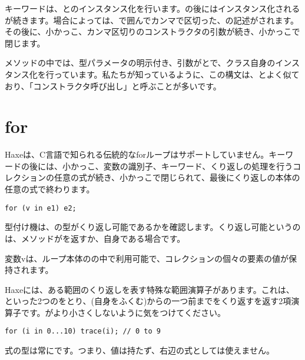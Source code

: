 キーワードは、とのインスタンス化を行います。の後にはインスタンス化されるが続きます。場合によっては、\expr{<>}で囲んでカンマ\expr{,}で区切った、の記述がされます。その後に、小かっこ\expr{(}、カンマ\expr{,}区切りのコンストラクタの引数が続き、小かっこ\expr{)}で閉じます。


メソッドの中では、型パラメータの明示付き、引数がとで、クラス自身のインスタンス化を行っています。私たちが知っているように、この構文は、とよく似ており、「コンストラクタ呼び出し」と呼ぶことが多いです。

\section{for}
\label{expression-for}

Haxeは、C言語で知られる伝統的なforループはサポートしていません。キーワードの後には、小かっこ\expr{(}、変数の識別子、キーワード、くり返しの処理を行うコレクションの任意の式が続き、小かっこ\expr{)}で閉じられて、最後にくり返しの本体の任意の式で終わります。

\begin{lstlisting}
for (v in e1) e2;
\end{lstlisting}

型付け機は、の型がくり返し可能であるかを確認します。くり返し可能というのは、メソッドがを返すか、自身である場合です。

変数vは、ループ本体のの中で利用可能で、コレクションの個々の要素の値が保持されます。

Haxeには、ある範囲のくり返しを表す特殊な範囲演算子があります。これは、といった2つのをとり、(自身をふくむ)からの一つ前までをくり返すを返す2項演算子です。がより小さくしないように気をつけてください。

\begin{lstlisting}
for (i in 0...10) trace(i); // 0 to 9
\end{lstlisting}

式の型は常にです。つまり、値は持たず、右辺の式としては使えません。

